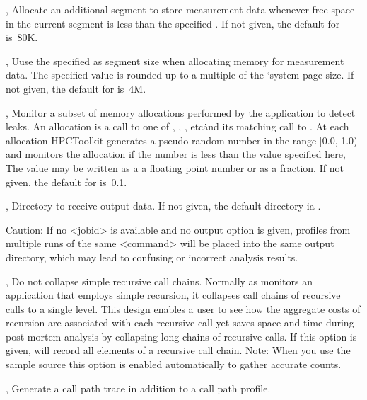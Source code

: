 \documentclass[english]{article}
\begin{document}
\begin{Description}
\item[\OptArg{-lm}{size}, \OptArg{--low-memsize}{size}]
Allocate an additional segment to store measurement data
whenever free space in the current segment is less than the specified .
If not given, the default for  is~80K.

\item[\OptArg{-m}{size}, \OptArg{--memsize}{size}]
Uuse the specified  as segment size when allocating memory for measurement data.
The specified value is rounded up to a multiple of the `system page size.
If not given, the default for  is~4M.

\item[\OptArg{-mp}{prob}, \OptArg{--memleak-prob}{prob}]
Monitor a subset of memory allocations performed by the application to detect leaks.
An allocation is a call to one of , , , etc\.
and its matching call to .
At each allocation HPCToolkit generates a pseudo-random number in the range [0.0, 1.0)
and monitors the allocation if the number is less than the value  specified here,
The value may be written as a a floating point number or as a fraction.
If not given, the default for  is~0.1.

\item[\OptArg{-o}{outpath}, \OptArg{--output}{outpath}]
Directory to receive output data.
If not given, the default directory ia .
\begin{itemize}
 Caution: If no <jobid> is available and no output option is given,
 profiles from multiple runs of the same <command> will be placed into the same output directory,
 which may lead to confusing or incorrect analysis results.
\end{itemize}

 \item[\Opt{-r}, \Opt{--retain-recursion}]
Do not collapse simple recursive call chains.
Normally as  monitors an application that employs simple recursion, it collapses call chains of recursive calls to a single level. 
This design enables a user to see how the aggregate costs of recursion are associated with each recursive call yet
saves space and time during post-mortem analysis by collapsing long chains of recursive calls.
If this option is given,  will record all elements of a recursive call chain.
Note: When you use the  sample source this option is enabled automatically
to gather accurate counts.

\item[\Opt{-t}, \Opt{--trace}]
Generate a call path trace in addition to a call path profile.

\end{Description}
\end{document}
